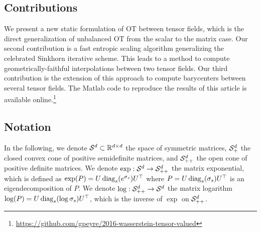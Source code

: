 




\subsection{Contributions} 

We present a new static formulation of OT between tensor fields, which is the direct generalization of unbalanced OT from the scalar to the matrix case.
%
Our second contribution is a fast entropic scaling algorithm generalizing the celebrated Sinkhorn iterative scheme. This leads to a method to compute geometrically-faithful interpolations between two tensor fields. 
%
Our third contribution is the extension of this approach to compute barycenters between several tensor fields. 
%
The Matlab code to reproduce the results of this article is available online.\footnote{\url{https://github.com/gpeyre/2016-wasserstein-tensor-valued}}

% 


\subsection{Notation}

In the following, we denote $\mathcal{S}^d \subset \mathbb{R}^{d \times d}$ the space of symmetric matrices, $\mathcal{S}_+^d$ the closed convex cone of positive semidefinite matrices, and $\mathcal{S}_{++}^d$ the open cone of positive definite matrices. 
%
We denote $\exp: \mathcal{S}^d \to \mathcal{S}_{++}^d$ the matrix exponential, which is defined as $\exp(P)=U \operatorname{diag}_s(e^{\sigma_s})U^\top$ where $P=U \operatorname{diag}_s(\sigma_s) U^\top$ is an eigendecomposition of $P$.
We denote $\log: \mathcal{S}_{++}^d \to \mathcal{S}^d$ the matrix logarithm $\log(P)=U \operatorname{diag}_s(\log \sigma_s)U^\top$, which is the inverse of $\exp$ on $\mathcal{S}_{++}^d$. %



